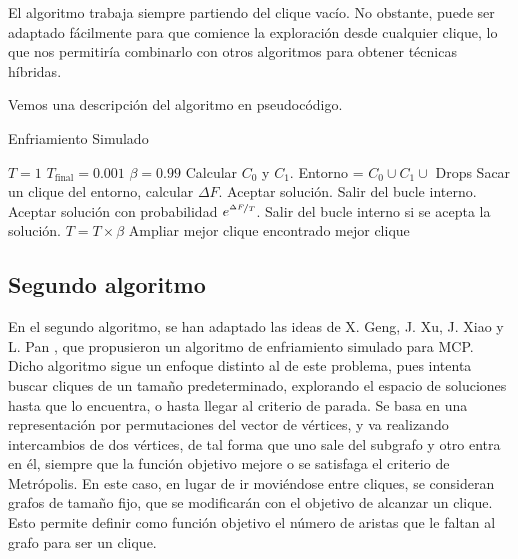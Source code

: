 El algoritmo trabaja siempre partiendo del clique vacío. No obstante, puede ser
adaptado fácilmente para que comience la exploración desde cualquier clique, lo
que nos permitiría combinarlo con otros algoritmos para obtener técnicas híbridas.

Vemos una descripción del algoritmo en pseudocódigo.

\begin{algorithm}[H]
\caption{Enfriamiento Simulado}
  \begin{algorithmic}
    \State $T = 1$
    \State $T_{\text{final}} = 0.001$
    \State $\beta = 0.99$
    \State Calcular $C_0$ y $C_1$.
    \Repeat
      \State Entorno = $C_0 \cup C_1 \cup$ Drops
      \Repeat
        \State Sacar un clique del entorno, calcular $\Delta F$.
          \State Aceptar solución.
          \State Salir del bucle interno.
        \Else
          \State Aceptar solución con probabilidad $e^{\nicefrac{\Delta F}{T}}$.
          \State Salir del bucle interno si se acepta la solución.
        \EndIf
      \State $T = T \times \beta$
    \State Ampliar mejor clique encontrado
    \Return mejor clique
    \EndFunction
  \end{algorithmic}
\end{algorithm}

\subsection{Segundo algoritmo}\label{enfriamiento2}

En el segundo algoritmo, se han adaptado las ideas de X. Geng, J. Xu, J. Xiao y L. Pan \citep{geng:2007},
que propusieron un algoritmo de enfriamiento simulado para MCP. Dicho algoritmo sigue
un enfoque distinto al de este problema, pues intenta buscar cliques de un tamaño
predeterminado, explorando el espacio de soluciones hasta que lo encuentra, o hasta
llegar al criterio de parada. Se basa en una representación por permutaciones del
vector de vértices, y va realizando intercambios de dos vértices, de tal forma que
uno sale del subgrafo y otro entra en él, siempre que la función objetivo mejore o
se satisfaga el criterio de Metrópolis. En este caso, en lugar de ir moviéndose entre
cliques, se consideran grafos de tamaño fijo, que se modificarán con el objetivo de
alcanzar un clique. Esto permite definir como función objetivo el número de aristas
que le faltan al grafo para ser un clique.

